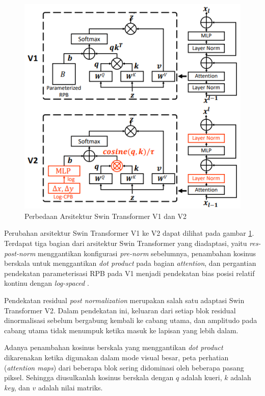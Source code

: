 \begin{figure}[ht]
  \centering
  \includegraphics[scale=0.75]{gambar/Perbedaan V1 V2.png}
  \caption{Perbedaan Arsitektur Swin Transformer V1 dan V2}
  \label{fig:perbandinganarsitekturswintransformerv1danv2}
\end{figure}

Perubahan arsitektur Swin Transformer V1 ke V2 dapat dilihat pada gambar \ref{fig:perbandinganarsitekturswintransformerv1danv2}. Terdapat tiga bagian dari arsitektur Swin Transformer yang diadaptasi, yaitu \emph{res-post-norm} menggantikan konfigurasi 
\emph{pre-norm} sebelumnya, penambahan kosinus berskala untuk menggantikan \emph{dot product} pada bagian \emph{attention}, dan pergantian pendekatan parameterisasi RPB pada V1 menjadi pendekatan bias posisi 
relatif kontinu dengan \emph{log-spaced} \parencite{Liuv22021}.

Pendekatan residual \emph{post normalization} merupakan salah satu adaptasi Swin Transformer V2. Dalam pendekatan ini, keluaran dari setiap blok residual dinormalisasi sebelum bergabung kembali ke 
cabang utama, dan amplitudo pada cabang utama tidak menumpuk ketika masuk ke lapisan yang lebih dalam.

Adanya penambahan kosinus berskala yang menggantikan \emph{dot product} dikarenakan ketika digunakan dalam mode visual besar, peta perhatian (\emph{attention maps}) dari beberapa blok sering didominasi 
oleh beberapa pasang piksel. Sehingga diusulkanlah kosinus berskala dengan \begin{math}q\end{math} adalah kueri, \begin{math}k\end{math} adalah \emph{key}, dan \begin{math}v\end{math} adalah nilai matriks.

